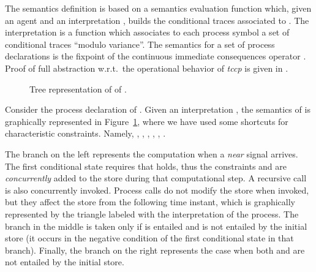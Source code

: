 \documentclass[american]{new_tlp}
\newcommand*{\progrule}{process declaration}
\newcommand*{\tccp}{\textit{tccp}}
\providecommand*{\wrt}  {w.r.t.}
\begin{document}
The semantics definition is based on a semantics evaluation function
 \cite{CominiTV13semTR} which, given an agent  and an
interpretation , builds the conditional traces associated to .
The interpretation  is a function which associates to each process
symbol a set of conditional traces ``modulo variance''.  The semantics for
a set of process declarations  is the fixpoint  of the continuous immediate consequences operator
.  Proof of full abstraction \wrt\ the operational
behavior of \tccp{} is given in \cite{CominiTV13semTR}.
\begin{figure}[tp]
    \caption{Tree representation of   of
    .}
    \label{fig:controllerSmallStep}
\end{figure}  
\begin{example}\label{ex:TrainSmallStep}
    Consider the \progrule{}  of .
    Given an interpretation , the semantics of
     is graphically represented in
    Figure~\ref{fig:controllerSmallStep}, where we have used some shortcuts
    for characteristic constraints.  Namely, , , , , , .
    
    The branch on the left represents the computation when a \emph{near}
    signal arrives.  The first conditional state requires that
     holds, thus the constraints  and
     are \emph{concurrently} added to the store during
    that computational step.  A recursive call is also concurrently
    invoked.  Process calls do not modify the store when invoked, but they
    affect the store from the following time instant, which is graphically
    represented by the triangle labeled with the interpretation of the
    process.  The branch in the middle is taken only if  is
    entailed and  is not entailed by the initial store (it
    occurs in the negative condition of the first conditional state in that
    branch).  Finally, the branch on the right represents the case when
    both  and  are not entailed by the
    initial store.
\end{example}
\end{document}
